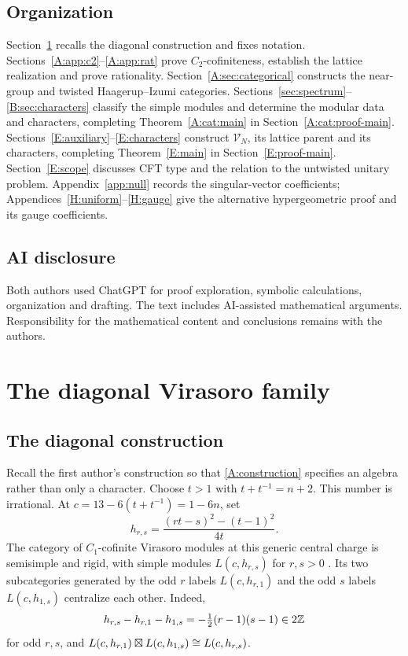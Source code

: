 \documentclass[11pt]{article}
\numberwithin{equation}{section}
\begin{document}
\subsection*{Organization}
Section~\ref{sec:inputs} recalls the diagonal construction and fixes notation. Sections~\ref{A:app:c2}--\ref{A:app:rat} prove $C_2$-cofiniteness, establish the lattice realization and prove rationality. Section~\ref{A:sec:categorical} constructs the near-group and twisted Haagerup--Izumi categories. Sections~\ref{sec:spectrum}--\ref{B:sec:characters} classify the simple modules and determine the modular data and characters, completing Theorem~\ref{A:cat:main} in Section~\ref{A:cat:proof-main}. Sections~\ref{E:auxiliary}--\ref{E:characters} construct $\mathscr{V}_N$, its lattice parent and its characters, completing Theorem~\ref{E:main} in Section~\ref{E:proof-main}. Section~\ref{E:scope} discusses CFT type and the relation to the untwisted unitary problem. Appendix~\ref{app:null} records the singular-vector coefficients; Appendices~\ref{H:uniform}--\ref{H:gauge} give the alternative hypergeometric proof and its gauge coefficients.

\subsection*{AI disclosure}
Both authors used ChatGPT for proof exploration, symbolic calculations, organization and drafting. The text includes AI-assisted mathematical arguments. Responsibility for the mathematical content and conclusions remains with the authors.

\clearpage
\tableofcontents
\clearpage
\section{The diagonal Virasoro family}\label{sec:inputs}
\subsection{The diagonal construction}\label{sec:diagonal}
Recall the first author's construction \cite[Theorem~3.2]{A:Evans} so that \eqref{A:construction} specifies an algebra rather than only a character. Choose $t>1$ with $t+t^{-1}=n+2$. This number is irrational. At $c=13-6(t+t^{-1})=1-6n$, set
\[
h_{r,s}=\frac{(rt-s)^2-(t-1)^2}{4t}.
\]
The category of $C_1$-cofinite Virasoro modules at this generic central charge is semisimple and rigid, with simple modules $L(c,h_{r,s})$ for $r,s>0$ \cite{A:CJORY}. Its two subcategories generated by the odd $r$ labels $L(c,h_{r,1})$ and the odd $s$ labels $L(c,h_{1,s})$ centralize each other. Indeed,
\[
h_{r,s}-h_{r,1}-h_{1,s}=-\tfrac12(r-1)(s-1)\in2\mathbb Z
\]
for odd $r,s$, and $L(c,h_{r,1})\boxtimes L(c,h_{1,s})\cong L(c,h_{r,s})$.
\end{document}
